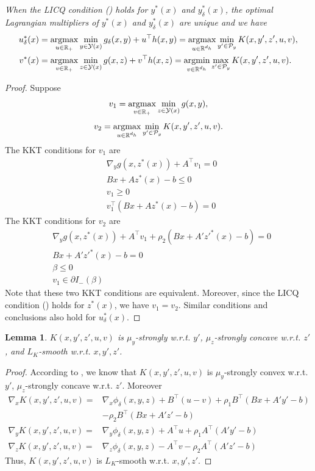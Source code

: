 \documentclass{article}
\newcommand{\Pc}{\mathcal{P}}
\newcommand{\Yc}{\mathcal{Y}}
\def\R{\mathbb{R}}
\newcommand{\argmin}{\mathop{\rm argmin}}
\newcommand{\argmax}{\mathop{\rm argmax}}
\theoremstyle{plain}
\newtheorem{lemma}[theorem]{Lemma}
\theoremstyle{definition}
\theoremstyle{remark}
\begin{document}
\subsection*{}
\emph{When the LICQ condition () holds for $y^*(x)$ and $y^*_\delta(x)$, the optimal Lagrangian multipliers of $y^*(x)$ and $y^*_\delta(x)$ are unique and we have
    \begin{align*}
        u^*_\delta(x)&=\argmax_{u\in \R_+}\min_{y \in \Yc(x)}g_{\delta}(x,y)+u^\top h(x,y)=\argmax_{u\in \R^{d_h}}\min_{y' \in \Pc_y} K(x,y',z',u,v),\\
        v^*(x)&=\argmax_{v\in \R_+}\min_{z \in \Yc(x)}g(x,z)+v^\top h(x,z)=\argmin_{v\in \R^{d_h}}\max_{z' \in \Pc_y} K(x,y',z',u,v).
    \end{align*}
}


\begin{proof}
    Suppose $$v_1=\argmax_{v\in \R_+}\min_{z \in \Yc(x)}g(x,y),$$ $$v_2=\argmax_{u\in \R^{d_h}}\min_{y' \in \Pc_y} K(x,y',z',u,v).$$
    The KKT conditions for $v_1$ are
    \begin{align*}
        &\nabla_y g(x, z^*(x))+A^\top v_1=0\\
        &Bx+Az^*(x)-b\leq0\\
        &v_1\geq 0\\
        &v_1^\top(Bx+Az^*(x)-b)=0
    \end{align*}
    The KKT conditions for $v_2$ are
    \begin{align*}
        &\nabla_y g(x, z^*(x))+A^\top v_1+\rho_2(Bx+A'z'^*(x)-b)=0\\
        &Bx+A'z'^*(x)-b=0\\
        &\beta\leq 0\\
        &v_1 \in \partial I_-(\beta)
    \end{align*}
Note that these two KKT conditions are equivalent. Moreover, since the LICQ condition () holds for $z^*(x)$, we have $v_1=v_2$. Similar conditions and conclusions also hold for $u^*_\delta(x)$.
\end{proof}

\begin{lemma}
    $K(x,y',z',u,v)$ is $\mu_y$-strongly w.r.t. $y'$, $\mu_z$-strongly concave w.r.t. $z'$, and $L_K$-smooth w.r.t. $x, y', z'$.
\end{lemma}

\begin{proof}
    According to , we know that $K(x,y',z',u,v)$ is $\mu_y$-strongly convex w.r.t. $y'$, $\mu_z$-strongly concave w.r.t. $z'$. Moreover
    \begin{align*}
        \nabla_x K(x,y',z',u,v)=&\nabla_x \phi_\delta(x,y,z)+B^\top(u-v)+\rho_1B^\top(Bx+A'y'-b)\\
        &-\rho_2B^\top(Bx+A'z'-b)\\
        \nabla_y K(x,y',z',u,v)=&\nabla_y \phi_\delta(x,y,z)+ A^\top u+\rho_1 A^\top(A'y'-b)\\
        \nabla_z K(x,y',z',u,v)=&\nabla_z \phi_\delta(x,y,z)- A^\top v-\rho_2 A^\top(A'z'-b)
    \end{align*}
    Thus, $K(x,y',z',u,v)$ is $L_K$-smooth w.r.t. $x, y', z'$.
\end{proof}
\end{document}
